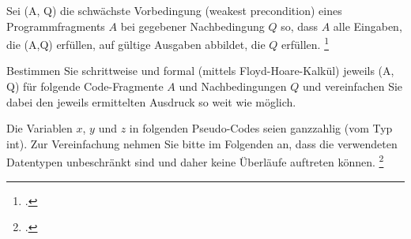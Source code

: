\documentclass{bschlangaul-aufgabe}
\begin{document}

\let\wp=\liWpKalkuel
\let\equivalent=\liWpEquivalent
\let\erklaerung=\liWpErklaerung
\def\m#1{\textcolor{blue}{#1}}
\def\k#1{\hfill{\scriptsize(#1)}}

Sei (A, Q) die schwächste Vorbedingung (weakest precondition)
eines Programmfragments $A$ bei gegebener Nachbedingung $Q$ so, dass $A$
alle Eingaben, die (A,Q) erfüllen, auf gültige Ausgaben
abbildet, die $Q$ erfüllen.
\footcite{examen:46116:2015:09}

Bestimmen Sie schrittweise und formal (mittels Floyd-Hoare-Kalkül)
jeweils (A, Q) für folgende Code-Fragmente $A$ und
Nachbedingungen $Q$ und vereinfachen Sie dabei den jeweils ermittelten
Ausdruck so weit wie möglich.

Die Variablen $x$, $y$ und $z$ in folgenden Pseudo-Codes seien
ganzzahlig (vom Typ int). Zur Vereinfachung nehmen Sie bitte im
Folgenden an, dass die verwendeten Datentypen unbeschränkt sind und
daher keine Überläufe auftreten können.
\footcite{sosy:pu:5:4}
\end{document}
